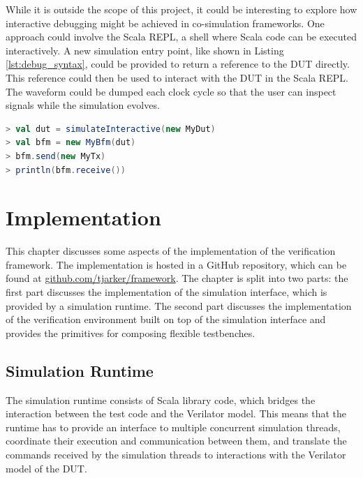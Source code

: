 While it is outside the scope of this project, it could be interesting to
explore how interactive debugging might be achieved in co-simulation frameworks. One approach could
involve the Scala REPL, a shell where Scala code can be executed interactively. A new simulation entry point, like
shown in Listing \ref{lst:debug_syntax}, could be provided to return a reference to the DUT directly. This reference
could then be used to interact with the DUT in the Scala REPL. The waveform could be dumped each clock cycle so
that the user can inspect signals while the simulation evolves.

\begin{listing}
\begin{lstlisting}[language=scala, captionpos=b, caption=Outline of an interactive debugging approach using the Scala REPL.,label=lst:debug_syntax]
> val dut = simulateInteractive(new MyDut)
> val bfm = new MyBfm(dut)
> bfm.send(new MyTx)
> println(bfm.receive())
\end{lstlisting}
\end{listing}





\chapter{Implementation} %

This chapter discusses some aspects of the implementation of the verification framework. The implementation is hosted in a GitHub repository, which can be found at \href{https://github.com/tjarker/framework}{github.com/tjarker/framework}. The chapter is split into two parts: the first part discusses the implementation of the simulation interface, which is provided by a simulation runtime. The second part discusses the implementation of the verification environment built on top of the simulation interface and provides the primitives for composing flexible testbenches.

\section{Simulation Runtime} %

The simulation runtime consists of Scala library code, which bridges the interaction between the test code and the Verilator model. This means that the runtime has to provide an interface to multiple concurrent simulation threads, coordinate their execution and communication between them, and translate the commands received by the simulation threads to interactions with the Verilator model of the DUT.

